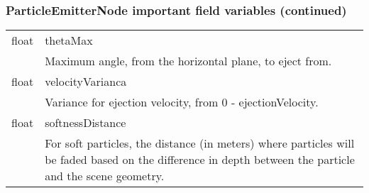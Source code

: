 \begin{frame}
\frametitle{ParticleEmitterNode important field variables (continued)}
\begin{center}
\begin{tabular}{r p{10cm}}
float & thetaMax\\
 & Maximum angle, from the horizontal plane, to eject from.\\
 \hline
float & velocityVarianca\\
 & Variance for ejection velocity, from 0 - ejectionVelocity. \\
 \hline
float & softnessDistance\\
 & For soft particles, the distance (in meters) where particles will be faded based on the difference in depth between the particle and the scene geometry. \\
\end{tabular}
\end{center}
\end{frame}

